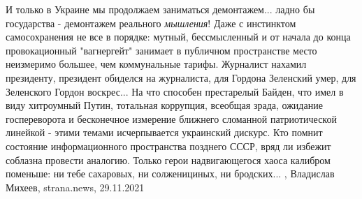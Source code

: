 И только в Украине мы продолжаем заниматься демонтажем... ладно бы государства
- демонтажем реального \emph{мышления}!  Даже с инстинктом самосохранения не
все в порядке: мутный, бессмысленный и от начала до конца провокационный
"вагнергейт" занимает в публичном пространстве место неизмеримо большее, чем
коммунальные тарифы.  Журналист нахамил президенту, президент обиделся на
журналиста, для Гордона Зеленский умер, для Зеленского Гордон воскрес...  На
что способен престарелый Байден, что имел в виду хитроумный Путин, тотальная
коррупция, всеобщая зрада, ожидание госпереворота и бесконечное измерение
ближнего сломанной патриотической линейкой - этими темами исчерпывается
украинский дискурс.  Кто помнит состояние информационного пространства позднего
СССР, вряд ли избежит соблазна провести аналогию.  Только герои надвигающегося
хаоса калибром поменьше: ни тебе сахаровых, ни солженициных, ни бродских...
, 
Владислав Михеев, strana.news, 29.11.2021
